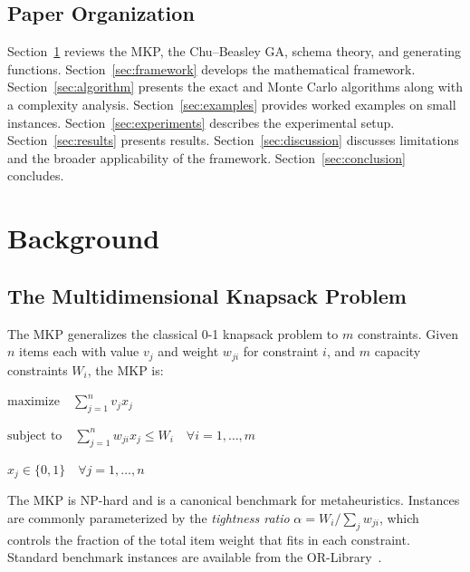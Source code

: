 \documentclass[twocolumn]{article}
\begin{document}
\subsection{Paper Organization}

Section~\ref{sec:background} reviews the MKP, the Chu--Beasley GA, 
schema theory, and generating functions. Section~\ref{sec:framework} 
develops the mathematical framework. Section~\ref{sec:algorithm} presents 
the exact and Monte Carlo algorithms along with a complexity analysis. 
Section~\ref{sec:examples} provides worked examples on small instances. 
Section~\ref{sec:experiments} describes the experimental setup. 
Section~\ref{sec:results} presents results. Section~\ref{sec:discussion} 
discusses limitations and the broader applicability of the framework. 
Section~\ref{sec:conclusion} concludes.

\section{Background}
\label{sec:background}

\subsection{The Multidimensional Knapsack Problem}

The MKP generalizes the classical 0-1 knapsack problem to $m$ constraints. 
Given $n$ items each with value $v_j$ and weight $w_{ji}$ for constraint 
$i$, and $m$ capacity constraints $W_i$, the MKP is:

\begin{flushleft}
\hspace{2em}$\text{maximize} \quad \displaystyle\sum_{j=1}^{n} v_j x_j$
\end{flushleft}

\begin{flushleft}
\hspace{2em}$\text{subject to} \quad \displaystyle\sum_{j=1}^{n} w_{ji} x_j 
\leq W_i \quad \forall i = 1, \ldots, m$
\end{flushleft}

\begin{flushleft}
\hspace{2em}$x_j \in \{0, 1\} \quad \forall j = 1, \ldots, n$
\end{flushleft}

The MKP is NP-hard and is a canonical benchmark for metaheuristics. 
Instances are commonly parameterized by the \textit{tightness ratio} 
$\alpha = W_i / \sum_j w_{ji}$, which controls the fraction of the total 
item weight that fits in each constraint. Standard benchmark instances 
are available from the OR-Library~\cite{beasley1990orlib}.
\end{document}
